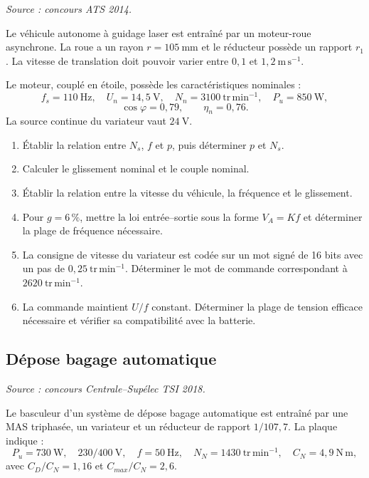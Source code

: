 \textit{Source : concours ATS 2014.}


Le véhicule autonome à guidage laser est entraîné par un moteur-roue asynchrone. La roue a un rayon $r=105\ \mathrm{mm}$ et le réducteur possède un rapport $r_1$. La vitesse de translation doit pouvoir varier entre $0{,}1$ et $1{,}2\ \mathrm{m\,s^{-1}}$.

Le moteur, couplé en étoile, possède les caractéristiques nominales :
\[
f_s=110\ \mathrm{Hz},\quad U_n=14{,}5\ \mathrm V,\quad
N_n=3100\ \mathrm{tr\,min^{-1}},\quad P_u=850\ \mathrm W,
\]
\[
\cos\varphi=0{,}79,\qquad \eta_n=0{,}76.
\]
La source continue du variateur vaut $24\ \mathrm V$.

\begin{enumerate}
  \item Établir la relation entre $N_s$, $f$ et $p$, puis déterminer $p$ et $N_s$.
  \item Calculer le glissement nominal et le couple nominal.
  \item Établir la relation entre la vitesse du véhicule, la fréquence et le glissement.
  \item Pour $g=6\,\%$, mettre la loi entrée--sortie sous la forme $V_A=Kf$ et déterminer la plage de fréquence nécessaire.
  \item La consigne de vitesse du variateur est codée sur un mot signé de 16 bits avec un pas de $0{,}25\ \mathrm{tr\,min^{-1}}$. Déterminer le mot de commande correspondant à $2620\ \mathrm{tr\,min^{-1}}$.
  \item La commande maintient $U/f$ constant. Déterminer la plage de tension efficace nécessaire et vérifier sa compatibilité avec la batterie.
\end{enumerate}

\subsection{Dépose bagage automatique}

\textit{Source : concours Centrale--Supélec TSI 2018.}

Le basculeur d'un système de dépose bagage automatique est entraîné par une MAS triphasée, un variateur et un réducteur de rapport $1/107{,}7$. La plaque indique :
\[
P_u=730\ \mathrm W,\quad 230/400\ \mathrm V,\quad f=50\ \mathrm{Hz},\quad
N_N=1430\ \mathrm{tr\,min^{-1}},\quad C_N=4{,}9\ \mathrm{N\,m},
\]
avec $C_D/C_N=1{,}16$ et $C_{max}/C_N=2{,}6$.

